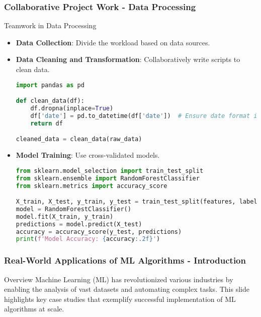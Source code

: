 \documentclass[aspectratio=169]{beamer}
\begin{document}
\begin{frame}[fragile]
    \frametitle{Collaborative Project Work - Data Processing}
    \begin{block}{Teamwork in Data Processing}
        \begin{itemize}
            \item \textbf{Data Collection}: Divide the workload based on data sources.
            \item \textbf{Data Cleaning and Transformation}: Collaboratively write scripts to clean data.
            \begin{lstlisting}[language=Python]
import pandas as pd

def clean_data(df): 
    df.dropna(inplace=True)
    df['date'] = pd.to_datetime(df['date'])  # Ensure date format is correct
    return df

cleaned_data = clean_data(raw_data)
            \end{lstlisting}
            \item \textbf{Model Training}: Use cross-validated models.
            \begin{lstlisting}[language=Python]
from sklearn.model_selection import train_test_split
from sklearn.ensemble import RandomForestClassifier
from sklearn.metrics import accuracy_score

X_train, X_test, y_train, y_test = train_test_split(features, labels, test_size=0.2)
model = RandomForestClassifier()
model.fit(X_train, y_train)
predictions = model.predict(X_test)
accuracy = accuracy_score(y_test, predictions)
print(f'Model Accuracy: {accuracy:.2f}')
            \end{lstlisting}
        \end{itemize}
    \end{block}
\end{frame}

\begin{frame}[fragile]
    \frametitle{Real-World Applications of ML Algorithms - Introduction}
    \begin{block}{Overview}
        Machine Learning (ML) has revolutionized various industries by enabling the analysis of vast datasets and automating complex tasks.
        This slide highlights key case studies that exemplify successful implementation of ML algorithms at scale.
    \end{block}
\end{frame}
\end{document}
